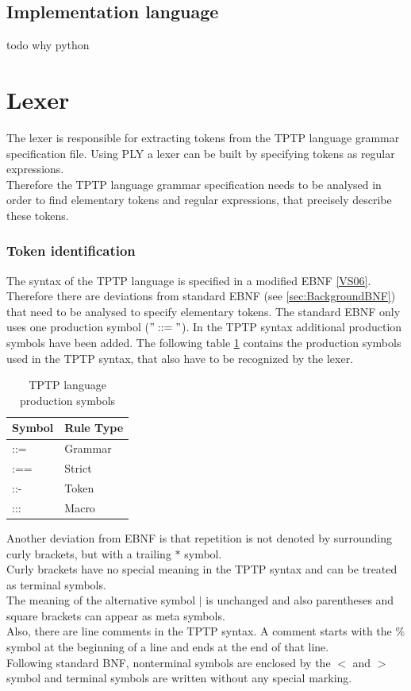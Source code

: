 \subsection{Implementation language}\label{sec:ConceptImplementationLanguage}
todo why python

\section{Lexer}\label{sec:ConceptLexer}
The lexer is responsible for extracting tokens from the TPTP language grammar specification file. Using \ac{PLY} a lexer can be built by specifying tokens as regular expressions.\\
Therefore the TPTP language grammar specification needs to be analysed in order to find elementary tokens and regular expressions, that precisely describe these
tokens. 

\subsubsection{Token identification}\label{sec:ConceptElementaryTokens}
The syntax of the \ac{TPTP} language is specified in a modified \ac{EBNF} \ref{VS06}.
Therefore there are deviations from standard \ac{EBNF} (see \ref{sec:BackgroundBNF}) that need to be analysed to specify elementary tokens.
The standard \ac{EBNF} only uses one production symbol ($"::="$).
In the \ac{TPTP} syntax additional production symbols have been added.
The following table \ref{tbl:ConceptTPTPProductionSymbols} contains the production symbols used in the \ac{TPTP} syntax, that also have to be recognized by the lexer.
\begin{table}[H]
\centering
\renewcommand{\arraystretch}{1}
\caption{\ac{TPTP} language production symbols \cite{VS06}}
\begin{tabular}{ll}
\textbf{Symbol} & \textbf{Rule Type}\\\hline
::= & Grammar\\
:== & Strict\\
::- & Token\\
::: & Macro\\
\end{tabular}
\label{tbl:ConceptTPTPProductionSymbols}
\end{table}

Another deviation from \ac{EBNF} is that repetition is not denoted by surrounding curly brackets, but with a trailing $*$ symbol.\\
Curly brackets have no special meaning in the \ac{TPTP} syntax and can be treated as terminal symbols.\\
The meaning of the alternative symbol $|$ is unchanged and also parentheses and square brackets can appear as meta symbols.\\
Also, there are line comments in the \ac{TPTP} syntax.
A comment starts with the $\%$ symbol at the beginning of a line and ends at the end of that line.\\
Following standard \ac {BNF}, nonterminal symbols are enclosed by the $<$ and $>$ symbol and terminal symbols are written without any special marking.

